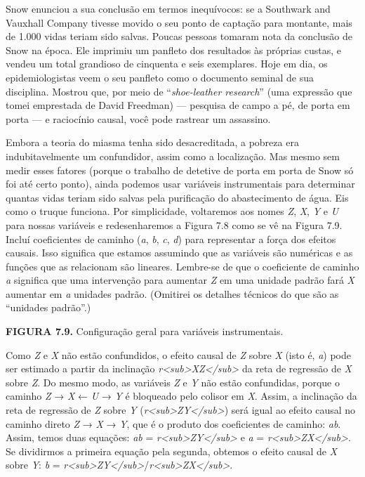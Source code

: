\documentclass[11pt,a5paper,twoside]{book}
\begin{document}
Snow enunciou a sua conclusão em termos inequívocos: se a Southwark and Vauxhall Company tivesse movido o seu ponto de captação para montante, mais de 1.000 vidas teriam sido salvas. Poucas pessoas tomaram nota da conclusão de Snow na época. Ele imprimiu um panfleto dos resultados às próprias custas, e vendeu um total grandioso de cinquenta e seis exemplares. Hoje em dia, os epidemiologistas veem o seu panfleto como o documento seminal de sua disciplina. Mostrou que, por meio de “\textit{shoe-leather research}” (uma expressão que tomei emprestada de David Freedman) — pesquisa de campo a pé, de porta em porta — e raciocínio causal, você pode rastrear um assassino.

Embora a teoria do miasma tenha sido desacreditada, a pobreza era indubitavelmente um confundidor, assim como a localização. Mas mesmo sem medir esses fatores (porque o trabalho de detetive de porta em porta de Snow só foi até certo ponto), ainda podemos usar variáveis instrumentais para determinar quantas vidas teriam sido salvas pela purificação do abastecimento de água. Eis como o truque funciona. Por simplicidade, voltaremos aos nomes \textit{Z}, \textit{X}, \textit{Y} e \textit{U} para nossas variáveis e redesenharemos a Figura 7.8 como se vê na Figura 7.9. Incluí coeficientes de caminho (\textit{a}, \textit{b}, \textit{c}, \textit{d}) para representar a força dos efeitos causais. Isso significa que estamos assumindo que as variáveis são numéricas e as funções que as relacionam são lineares. Lembre-se de que o coeficiente de caminho \textit{a} significa que uma intervenção para aumentar \textit{Z} em uma unidade padrão fará \textit{X} aumentar em \textit{a} unidades padrão. (Omitirei os detalhes técnicos do que são as “unidades padrão”.)

\textbf{FIGURA 7.9.} Configuração geral para variáveis instrumentais.

Como \textit{Z} e \textit{X} não estão confundidos, o efeito causal de \textit{Z} sobre \textit{X} (isto é, \textit{a}) pode ser estimado a partir da inclinação \textit{r<sub>XZ</sub>} da reta de regressão de \textit{X} sobre \textit{Z}. Do mesmo modo, as variáveis \textit{Z} e \textit{Y} não estão confundidas, porque o caminho \textit{Z} → \textit{X} ← \textit{U} → \textit{Y} é bloqueado pelo colisor em \textit{X}. Assim, a inclinação da reta de regressão de \textit{Z} sobre \textit{Y} (\textit{r<sub>ZY</sub>}) será igual ao efeito causal no caminho direto \textit{Z} → \textit{X} → \textit{Y}, que é o produto dos coeficientes de caminho: \textit{ab}. Assim, temos duas equações: \textit{ab} = \textit{r<sub>ZY</sub>} e \textit{a} = \textit{r<sub>ZX</sub>}. Se dividirmos a primeira equação pela segunda, obtemos o efeito causal de \textit{X} sobre \textit{Y}: \textit{b} = \textit{r<sub>ZY</sub>}/\textit{r<sub>ZX</sub>}.
\end{document}
